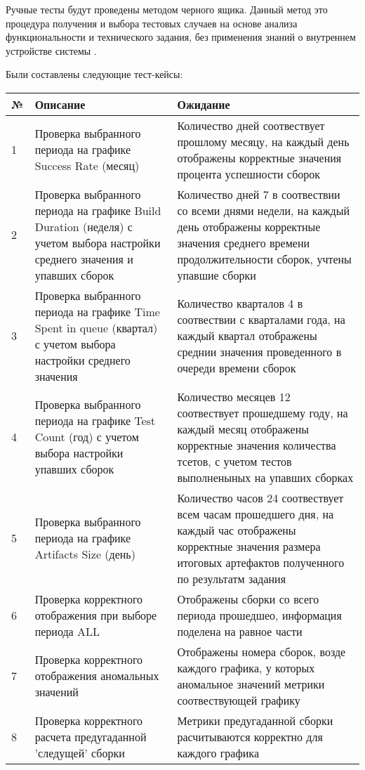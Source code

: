 Ручные тесты будут проведены методом черного ящика. Данный метод это процедура получения и выбора тестовых случаев на основе анализа функциональности и технического задания, без применения знаний о внутреннем устройстве системы \cite{blacktest}.

Были составлены следующие тест-кейсы:

\begin{table}
    \centering
    \begin{tabular}{|p{1cm}|p{5cm}|p{9cm}|}
    \hline
        № & Описание & Ожидание  \\ \hline
        1 & Проверка выбранного периода на графике Success Rate (месяц) & Количество  дней соотвествует прошлому месяцу, на каждый день отображены корректные значения процента успешности сборок\\ \hline
        2 & Проверка выбранного периода на графике Build Duration (неделя) с учетом выбора настройки среднего значения и  упавших сборок& Количество  дней 7 в соотвествии со всеми днями недели, на каждый день отображены корректные значения среднего времени продолжительности сборок, учтены упавшие сборки \\ \hline
        3 & Проверка выбранного периода на графике Time Spent in queue (квартал) с учетом выбора настройки среднего значения & Количество  кварталов 4 в соотвествии с кварталами года, на каждый квартал отображены среднии значения проведенного в очереди времени сборок  \\ \hline
        4 & Проверка выбранного периода на графике Test Count (год) с учетом выбора настройки упавших сборок & Количество  месяцев 12 соотвествует прошедшему году, на каждый месяц отображены корректные значения  количества тсетов, с учетом тестов выполненыных на упавших сборках \\ \hline
        5 & Проверка выбранного периода на графике Artifacts Size (день) & Количество  часов 24 соотвествует всем часам прошедшего дня, на каждый час отображены корректные значения размера итоговых артефактов полученного по результатм задания   \\ \hline
        6 & Проверка корректного отображения при выборе периода ALL & Отображены сборки со всего периода прошедшео, информация поделена на равное части   \\ \hline
        7 & Проверка корректного отображения аномальных значений & Отображены номера сборок, возде каждого графика, у которых аномальное значений метрики соотвествующей графику   \\ \hline
        8 & Проверка корректного расчета предугаданной 'следущей' сборки& Метрики предугаданной сборки расчитываются корректно для каждого графика   \\ \hline

    \end{tabular}
\end{table}	
 






